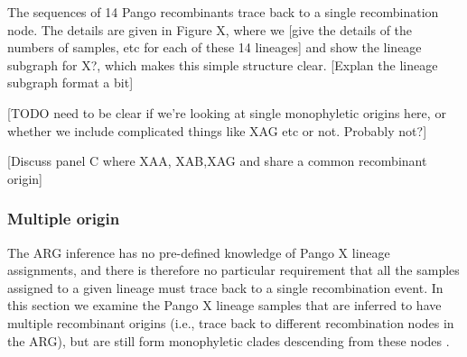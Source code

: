 \documentclass{article}
\begin{document}
The sequences of 14 Pango recombinants trace back to a single recombination
node. The details are given in Figure X, where we [give the details of
the numbers of samples, etc for each of these 14 lineages] and
show the lineage subgraph for X?, which makes this simple structure
clear. [Explan the lineage subgraph format a bit]

[TODO need to be clear if we're looking at single monophyletic origins
here, or whether we include complicated things like XAG etc or not.
Probably not?]


[Discuss panel C where XAA, XAB,XAG and share a common recombinant origin]

\subsubsection{Multiple origin}
The ARG inference has no pre-defined knowledge of Pango X lineage assignments,
and there is therefore no particular requirement that all the samples
assigned to a given lineage must trace back to a single recombination
event. In this section we examine the Pango X lineage samples that
are inferred to have multiple recombinant origins (i.e., trace
back to different recombination nodes in the ARG), but are still
form monophyletic clades %
descending from these nodes .
\end{document}
